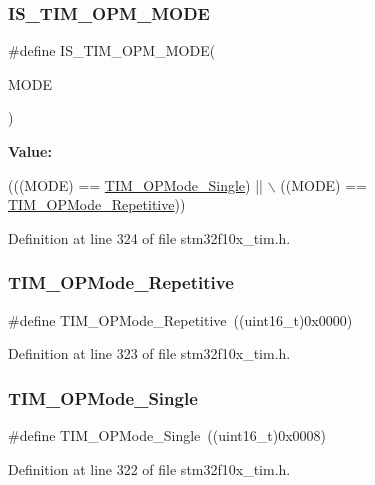 \subsubsection{\texorpdfstring{I\+S\+\_\+\+T\+I\+M\+\_\+\+O\+P\+M\+\_\+\+M\+O\+DE}{IS\_TIM\_OPM\_MODE}}
{\footnotesize\ttfamily \#define I\+S\+\_\+\+T\+I\+M\+\_\+\+O\+P\+M\+\_\+\+M\+O\+DE(\begin{DoxyParamCaption}\item[{}]{M\+O\+DE }\end{DoxyParamCaption})}

{\bfseries Value\+:}
\begin{DoxyCode}
(((MODE) == \hyperlink{group___t_i_m___one___pulse___mode_ga99d934fdbc54ea4ee2cf5c86860f9227}{TIM\_OPMode\_Single}) || \(\backslash\)
                               ((MODE) == \hyperlink{group___t_i_m___one___pulse___mode_gad921d739c86bf48dca12442a81ad68ad}{TIM\_OPMode\_Repetitive}))
\end{DoxyCode}


Definition at line 324 of file stm32f10x\+\_\+tim.\+h.

\mbox{\label{group___t_i_m___one___pulse___mode_gad921d739c86bf48dca12442a81ad68ad}} 
\subsubsection{\texorpdfstring{T\+I\+M\+\_\+\+O\+P\+Mode\+\_\+\+Repetitive}{TIM\_OPMode\_Repetitive}}
{\footnotesize\ttfamily \#define T\+I\+M\+\_\+\+O\+P\+Mode\+\_\+\+Repetitive~((uint16\+\_\+t)0x0000)}



Definition at line 323 of file stm32f10x\+\_\+tim.\+h.

\mbox{\label{group___t_i_m___one___pulse___mode_ga99d934fdbc54ea4ee2cf5c86860f9227}} 
\subsubsection{\texorpdfstring{T\+I\+M\+\_\+\+O\+P\+Mode\+\_\+\+Single}{TIM\_OPMode\_Single}}
{\footnotesize\ttfamily \#define T\+I\+M\+\_\+\+O\+P\+Mode\+\_\+\+Single~((uint16\+\_\+t)0x0008)}



Definition at line 322 of file stm32f10x\+\_\+tim.\+h.

